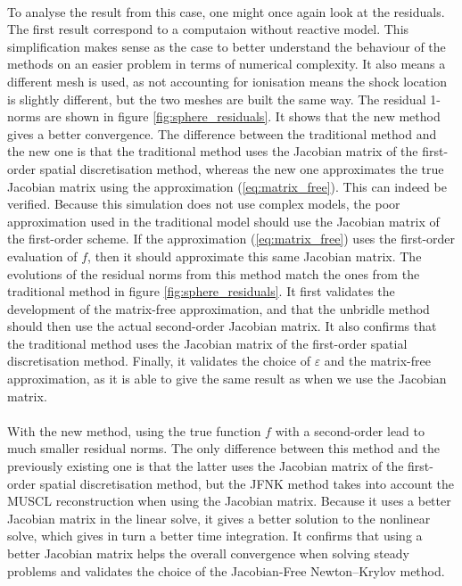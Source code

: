         \paragraph{}
        To analyse the result from this case, one might once again look at the residuals.
        The first result correspond to a computaion without reactive model.
        This simplification makes sense as the case to better understand the behaviour of the methods on an easier problem in terms of numerical complexity.
        It also means a different mesh is used, as not accounting for ionisation means the shock location is slightly different, but the two meshes are built the same way.
        The residual 1-norms are shown in figure \ref{fig:sphere_residuals}.
        It shows that the new method gives a better convergence.
        The difference between the traditional method and the new one is that the traditional method uses the Jacobian matrix of the first-order spatial discretisation method, whereas the new one approximates the true Jacobian matrix using the approximation (\ref{eq:matrix_free}).
        This can indeed be verified.
        Because this simulation does not use complex models, the poor approximation used in the traditional model should use the Jacobian matrix of the first-order scheme.
        If the approximation (\ref{eq:matrix_free}) uses the first-order evaluation of $f$, then it should approximate this same Jacobian matrix.
        The evolutions of the residual norms from this method match the ones from the traditional method in figure \ref{fig:sphere_residuals}.
        It first validates the development of the matrix-free approximation, and that the unbridle method should then use the actual second-order Jacobian matrix.
        It also confirms that the traditional method uses the Jacobian matrix of the first-order spatial discretisation method.
        Finally, it validates the choice of $\varepsilon$ and the matrix-free approximation, as it is able to give the same result as when we use the Jacobian matrix.

        \paragraph{}
        With the new method, using the true function $f$ with a second-order lead to much smaller residual norms.
        The only difference between this method and the previously existing one is that the latter uses the Jacobian matrix of the first-order spatial discretisation method, but the JFNK method takes into account the MUSCL reconstruction when using the Jacobian matrix.
        Because it uses a better Jacobian matrix in the linear solve, it gives a better solution to the nonlinear solve, which gives in turn a better time integration.
        It confirms that using a better Jacobian matrix helps the overall convergence when solving steady problems and validates the choice of the Jacobian-Free Newton--Krylov method.

